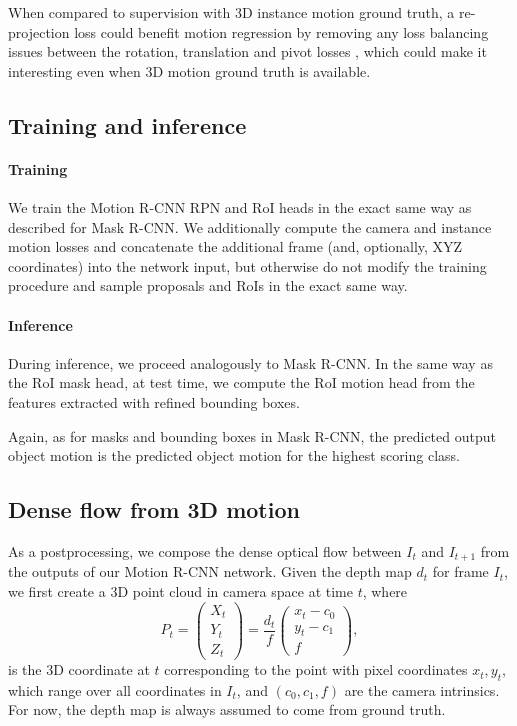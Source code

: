 When compared to supervision with 3D instance motion ground truth, a re-projection
loss could benefit motion regression by removing any loss balancing issues between the
rotation, translation and pivot losses \cite{PoseNet2},
which could make it interesting even when 3D motion ground truth is available.

\subsection{Training and inference}
\label{ssec:training_inference}
\paragraph{Training}
We train the Motion R-CNN RPN and RoI heads in the exact same way as described for Mask R-CNN.
We additionally compute the camera and instance motion losses and concatenate the additional
frame (and, optionally, XYZ coordinates) into the network input, but otherwise do not modify the training procedure
and sample proposals and RoIs in the exact same way.

\paragraph{Inference}
During inference, we proceed analogously to Mask R-CNN.
In the same way as the RoI mask head, at test time, we compute the RoI motion head
from the features extracted with refined bounding boxes.

Again, as for masks and bounding boxes in Mask R-CNN,
the predicted output object motion is the predicted object motion for the
highest scoring class.

\subsection{Dense flow from 3D motion}
\label{ssec:postprocessing}
As a postprocessing, we compose the dense optical flow between $I_t$ and $I_{t+1}$ from the outputs of our Motion R-CNN network.
Given the depth map $d_t$ for frame $I_t$, we first create a 3D point cloud in camera space at time $t$,
where
\begin{equation}
P_t =
\begin{pmatrix}
X_t \\ Y_t \\ Z_t
\end{pmatrix}
=
\frac{d_t}{f}
\begin{pmatrix}
x_t - c_0 \\ y_t - c_1 \\ f
\end{pmatrix},
\end{equation}
is the 3D coordinate at $t$ corresponding to the point with pixel coordinates $x_t, y_t$,
which range over all coordinates in $I_t$,
and $(c_0, c_1, f)$ are the camera intrinsics.
For now, the depth map is always assumed to come from ground truth.


